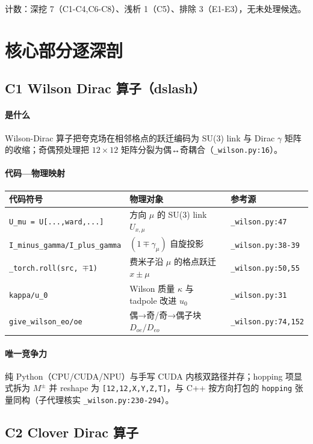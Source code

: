 \documentclass[UTF8]{ctexart}
\begin{document}
计数：深挖 7（C1-C4,C6-C8）、浅析 1（C5）、排除 3（E1-E3），无未处理候选。

\section{核心部分逐深剖}

\subsection{C1 Wilson Dirac 算子（dslash）}
\paragraph{是什么} Wilson-Dirac 算子把夸克场在相邻格点的跃迁编码为 SU(3) link 与 Dirac $\gamma$ 矩阵的收缩；奇偶预处理把 $12\times12$ 矩阵分裂为偶↔奇耦合（\texttt{\_wilson.py:16}）。
\paragraph{代码—物理映射}
\begin{xltabular}{\textwidth}{llX}
\toprule
\textcolor{relation}{代码符号} & 物理对象 & 参考源 \\
\midrule
\endhead
\texttt{U\_mu = U[...,ward,...]} & 方向 $\mu$ 的 SU(3) link $U_{x,\mu}$ & \texttt{\_wilson.py:47} \\
\texttt{I\_minus\_gamma/I\_plus\_gamma} & $(1\mp\gamma_\mu)$ 自旋投影 & \texttt{\_wilson.py:38-39} \\
\texttt{\_torch.roll(src, $\mp$1)} & 费米子沿 $\mu$ 的格点跃迁 $x\pm\mu$ & \texttt{\_wilson.py:50,55} \\
\texttt{kappa/u\_0} & Wilson 质量 $\kappa$ 与 tadpole 改进 $u_0$ & \texttt{\_wilson.py:31} \\
\texttt{give\_wilson\_eo/oe} & 偶→奇/奇→偶子块 $D_{oe}/D_{eo}$ & \texttt{\_wilson.py:74,152} \\
\bottomrule
\end{xltabular}
\paragraph{唯一竞争力} 纯 Python（CPU/CUDA/NPU）与手写 CUDA 内核双路径并存；hopping 项显式拆为 $M^\pm$ 并 reshape 为 \texttt{[12,12,X,Y,Z,T]}，与 C++ 按方向打包的 \texttt{hopping} 张量同构（子代理核实 \texttt{\_wilson.py:230-294}）。

\subsection{C2 Clover Dirac 算子}
\end{document}
